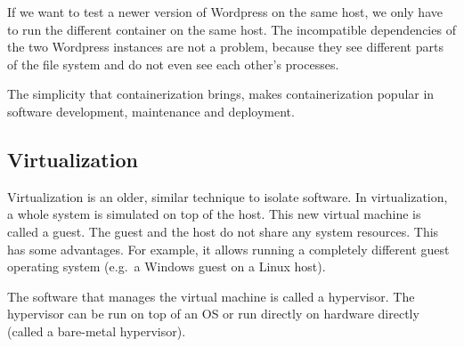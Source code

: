 If we want to test a newer version of Wordpress on the same host, we only have to run the different container on the same host. The incompatible dependencies of the two Wordpress instances are not a problem, because they see different parts of the file system and do not even see each other's processes.

\medskip

The simplicity that containerization brings, makes containerization popular in software development, maintenance and deployment.

\pagebreak

\subsection{Virtualization}
Virtualization is an older, similar technique to isolate software. In virtualization, a whole system is simulated on top of the host. This new virtual machine is called a guest. The guest and the host do not share any system resources. This has some advantages. For example, it allows running a completely different guest operating system (e.g.\ a Windows guest on a Linux host).

The software that manages the virtual machine is called a hypervisor. The hypervisor can be run on top of an OS or run directly on hardware directly (called a bare-metal hypervisor).


